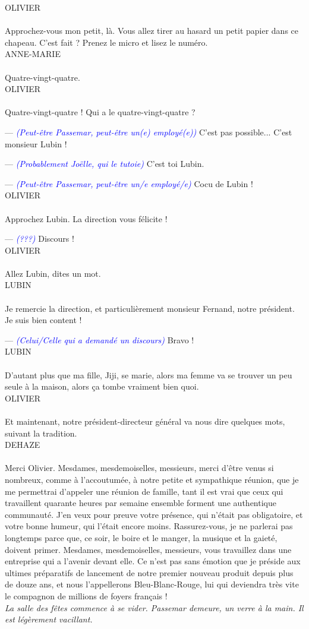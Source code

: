\documentclass[a4paper]{report}
\newcounter{rem}[chapter]
\newcounter{demo}[chapter]
\newcommand{\annot}[1]{{\footnotesize \textcolor{blue}{\textit{(#1)}}}}
\newcommand{\repl}[2]{\uppercase{#1}\\\\#2\\}
\newcommand{\didas}[1]{\textit{#1}\\}
\begin{document}
\repl{Olivier}{Approchez-vous mon petit, là. Vous allez tirer au hasard un petit papier dans ce chapeau. C'est fait ? Prenez le micro et lisez le numéro.}

\repl{Anne-Marie}{Quatre-vingt-quatre.}

\repl{Olivier}{Quatre-vingt-quatre ! Qui a le quatre-vingt-quatre ?

--- \annot{Peut-être Passemar, peut-être un(e) employé(e)} C'est pas possible... C'est monsieur Lubin !

--- \annot{Probablement Joëlle, qui le tutoie} C'est toi Lubin.

--- \annot{Peut-être Passemar, peut-être un/e employé/e} Cocu de Lubin !}

\repl{Olivier}{Approchez Lubin. La direction vous félicite !

--- \annot{???} Discours !}

\repl{Olivier}{Allez Lubin, dites un mot.}

\repl{Lubin}{Je remercie la direction, et particulièrement monsieur Fernand, notre président. Je suis bien content !

--- \annot{Celui/Celle qui a demandé un discours} Bravo !}

\repl{Lubin}{D'autant plus que ma fille, Jiji, se marie, alors ma femme va se trouver un peu seule à la maison, alors ça tombe vraiment bien quoi.}

\repl{Olivier}{Et maintenant, notre président-directeur général va nous dire quelques mots, suivant la tradition.}

\repl{Dehaze}{Merci Olivier. Mesdames, mesdemoiselles, messieurs, merci d'être venus si nombreux, comme à l'accoutumée, à notre petite et sympathique réunion, que je me permettrai d'appeler une réunion de famille, tant il est vrai que ceux qui travaillent quarante heures par semaine ensemble forment une authentique communauté. J'en veux pour preuve votre présence, qui n'était pas obligatoire, et votre bonne humeur, qui l'était encore moins. Rassurez-vous, je ne parlerai pas longtemps parce que, ce soir, le boire et le manger, la musique et la gaieté, doivent primer. Mesdames, mesdemoiselles, messieurs, vous travaillez dans une entreprise qui a l'avenir devant elle. Ce n'est pas sans émotion que je préside aux ultimes préparatifs de lancement de notre premier nouveau produit depuis plus de douze ans, et nous l'appellerons Bleu-Blanc-Rouge, lui qui deviendra très vite le compagnon de millions de foyers français !}

\didas{La salle des fêtes commence à se vider. Passemar demeure, un verre à la main. Il est légèrement vacillant.}
\end{document}
